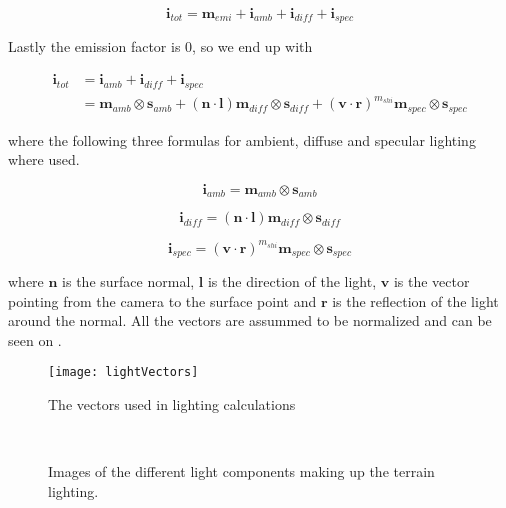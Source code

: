 \begin{displaymath}
  \mathbf{i}_{tot} = \mathbf{m}_{emi} + \mathbf{i}_{amb} + \mathbf{i}_{diff} + \mathbf{i}_{spec}
\end{displaymath}

Lastly the emission factor is 0, so we end up with

\begin{displaymath}
  \begin{array}{rl}
    \mathbf{i}_{tot} &= \mathbf{i}_{amb} + \mathbf{i}_{diff} +
    \mathbf{i}_{spec}\\
    &= \mathbf{m}_{amb} \otimes \mathbf{s}_{amb} + (\mathbf{n} \cdot
    \mathbf{l}) \mathbf{m}_{diff} \otimes \mathbf{s}_{diff} +
    (\mathbf{v} \cdot \mathbf{r})^{m_{shi}} \mathbf{m}_{spec} \otimes
    \mathbf{s}_{spec} 
  \end{array}
\end{displaymath}

where the following three formulas for ambient, diffuse and specular
lighting where used.

\begin{displaymath}
  \mathbf{i}_{amb} = \mathbf{m}_{amb} \otimes \mathbf{s}_{amb} 
\end{displaymath}

\begin{displaymath}
  \mathbf{i}_{diff} = (\mathbf{n} \cdot \mathbf{l}) \mathbf{m}_{diff} \otimes \mathbf{s}_{diff} 
\end{displaymath}

\begin{displaymath}
  \mathbf{i}_{spec} = (\mathbf{v} \cdot \mathbf{r})^{m_{shi}} \mathbf{m}_{spec} \otimes \mathbf{s}_{spec} 
\end{displaymath}

where $\mathbf{n}$ is the surface normal, $\mathbf{l}$ is the
direction of the light, $\mathbf{v}$ is the vector pointing from the
camera to the surface point and $\mathbf{r}$ is the reflection of the
light around the normal. All the vectors are assummed to be normalized
and can be seen on .

\begin{figure}
  \centering
  \label{fig:lightVectors}
  \texttt{[image: lightVectors]}
  \caption{The vectors used in lighting calculations}
\end{figure}

\begin{figure}
  \label{fig:lightComponents}
  \centering
  \\
  \caption{Images of the different light components making up the
    terrain lighting.}
\end{figure}


